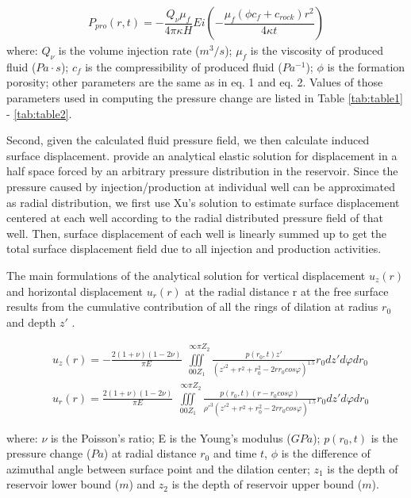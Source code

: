 \begin{equation}
\begin{aligned}
P_{pro}(r,t) = -\dfrac{Q_{\nu} \mu_{f}}{4 \pi \kappa H}
				Ei(-\dfrac{\mu_f(\phi c_f + c_{rock}) r^2}{4 \kappa t})
\end{aligned}
\end{equation}
where:
$Q_{\nu}$ is the volume injection rate ($m^3/s$); $\mu_f$ is the viscosity of produced fluid ($Pa\cdot s$); $c_f$ is the compressibility of produced fluid ($Pa^{-1}$);  $\phi$ is the formation porosity; other parameters are the same as in eq. 1 and eq. 2.   Values of those parameters used in computing the pressure change are listed in Table \ref{tab:table1} - \ref{tab:table2}.  

Second, given the calculated fluid pressure field, we then calculate induced surface displacement.  \citet[]{xu2012fluid} provide an analytical elastic solution for displacement in a half space forced by an arbitrary pressure distribution in the reservoir.  Since the pressure caused by injection/production at individual well can be approximated as radial distribution, we first use Xu's solution to estimate surface displacement centered at each well according to the radial distributed pressure field of that well.  Then, surface displacement of each well is linearly summed up to get the total surface displacement field due to all injection and production activities.  

The main formulations of the analytical solution for vertical displacement $u_{z}(r)$ and horizontal displacement $u_{r}(r)$ at the radial distance r at the free surface results from the cumulative contribution of all the rings of dilation at radius $r_{0}$ and depth $z'$ \cite{xu2012fluid}.

\begin{equation}
\begin{aligned}
& u_{z}(r)=-\frac{2(1+\nu)(1-2\nu)}{\pi E} \iiint \limits_{0 0 Z_1}^{\ \ \ \infty \pi Z_2} 
\frac{p(r_{0},t) z'}{(z'^{2} + r^2 + r_{0}^2 - 2rr_{0}cos\varphi)^{1.5}} r_{0} dz' d\varphi dr_{0} \\
& u_{r}(r)= \frac{2(1+\nu)(1-2\nu)}{\pi E} \iiint \limits_{0 0 Z_1}^{\ \ \ \infty \pi Z_2} 
\frac{p(r_{0},t) (r-r_{0}cos\varphi)}{\rho'^3 (z'^{2} + r^2 + r_{0}^2 - 2rr_{0}cos\varphi)^{1.5}} r_{0} dz' d\varphi dr_{0}
\end{aligned}
\end{equation}

where:
$\nu$ is the Poisson’s ratio; E is the Young’s modulus ($GPa$); $p(r_0,t)$  is the pressure change ($Pa$) at radial distance $r_0$ and time $t$,  $\phi$ is the difference of azimuthal angle between surface point and the dilation center; $z_1$ is the depth of reservoir lower bound ($m$) and $z_2$ is the depth of reservoir upper bound ($m$). 

